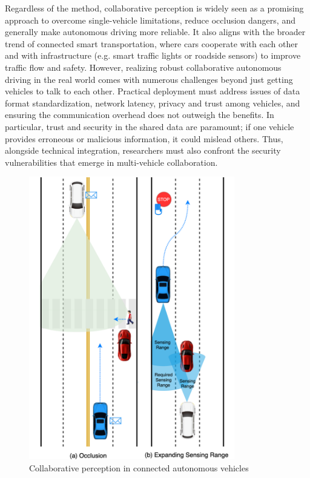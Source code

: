 Regardless of the method, collaborative perception is widely seen as a promising approach to overcome single-vehicle limitations, reduce occlusion dangers, and generally make autonomous driving more reliable.
It also aligns with the broader trend of connected smart transportation, where cars cooperate with each other and with infrastructure (e.g. smart traffic lights or roadside sensors) to improve traffic flow and safety.
However, realizing robust collaborative autonomous driving in the real world comes with numerous challenges beyond just getting vehicles to talk to each other. Practical deployment must address issues of data format standardization, network latency, privacy and trust among vehicles, and ensuring the communication overhead does not outweigh the benefits.
In particular, trust and security in the shared data are paramount; if one vehicle provides erroneous or malicious information, it could mislead others. Thus, alongside technical integration, researchers must also confront the security vulnerabilities that emerge in multi-vehicle collaboration.

\begin{figure}
    \centering
    \includegraphics[width=0.8\textwidth]{figures/introduction/permission-settings.png}
    \caption{Collaborative perception in connected autonomous vehicles}
    \label{fig:permission-settings}
\end{figure}


